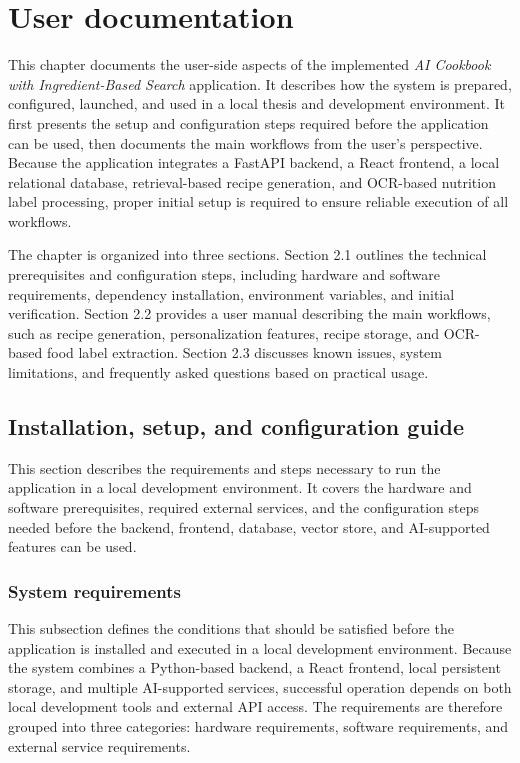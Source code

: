 \chapter{User documentation}
\label{ch:user}

This chapter documents the user-side aspects of the implemented
\emph{AI Cookbook with Ingredient-Based Search} application. It describes
how the system is prepared, configured, launched, and used in a
local thesis and development environment. It first presents the setup
and configuration steps required before the application can be used,
then documents the main workflows from the user's perspective. Because
the application integrates a FastAPI backend, a React frontend, a
local relational database, retrieval-based recipe generation, and
OCR-based nutrition label processing, proper initial setup is
required to ensure reliable execution of all workflows.

The chapter is organized into three sections. Section 2.1 outlines
the technical prerequisites and configuration steps, including
hardware and software requirements, dependency installation,
environment variables, and initial verification. Section 2.2
provides a user manual describing the main workflows, such as
recipe generation, personalization features, recipe storage, and
OCR-based food label extraction. Section 2.3 discusses known
issues, system limitations, and frequently asked questions based
on practical usage.

\cleardoublepage


\section{Installation, setup, and configuration guide}

This section describes the requirements and steps necessary to run
the application in a local development environment. It covers the
hardware and software prerequisites, required external services,
and the configuration steps needed before the backend, frontend,
database, vector store, and AI-supported features can be used.

\subsection{System requirements}

This subsection defines the conditions that should be satisfied
before the application is installed and executed in a local
development environment. Because the system combines a Python-based
backend, a React frontend, local persistent storage, and
multiple AI-supported services, successful operation depends on both
local development tools and external API access. The requirements
are therefore grouped into three categories: hardware requirements,
software requirements, and external service requirements.

